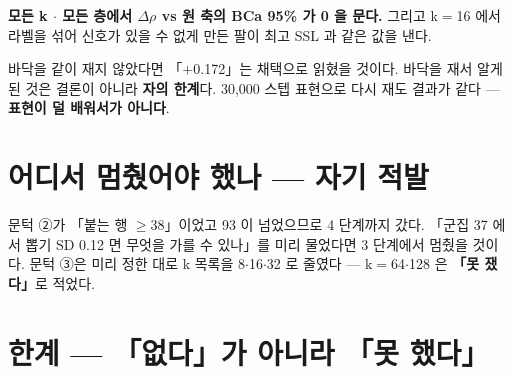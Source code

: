 \documentclass{article}
\begin{document}
\textbf{모든 k $\cdot$ 모든 층에서 $\Delta\rho$ vs 원 축의 BCa 95\% 가 0 을 문다.}
그리고 k$=$16 에서 라벨을 섞어 신호가 있을 수 없게 만든 팔이 최고 SSL 과 같은 값을 낸다.

{바닥을 같이 재지 않았다면 「$+$0.172」는 채택으로 읽혔을 것이다.
바닥을 재서 알게 된 것은 결론이 아니라 \textbf{자의 한계}다.}
30{,}000 스텝 표현으로 다시 재도 결과가 같다 --- \textbf{표현이 덜 배워서가 아니다}.

\section{어디서 멈췄어야 했나 --- 자기 적발}

{문턱 ②가 「붙는 행 $\ge$38」이었고 93 이 넘었으므로 4 단계까지 갔다.
「군집 37 에서 뽑기 SD 0.12 면 무엇을 가를 수 있나」를 미리 물었다면 3 단계에서 멈췄을 것이다.}
문턱 ③은 미리 정한 대로 k 목록을 8$\cdot$16$\cdot$32 로 줄였다 --- k$=$64$\cdot$128 은 \textbf{「못 쟀다」}로 적었다.

\section{한계 --- 「없다」가 아니라 「못 했다」}
\end{document}
